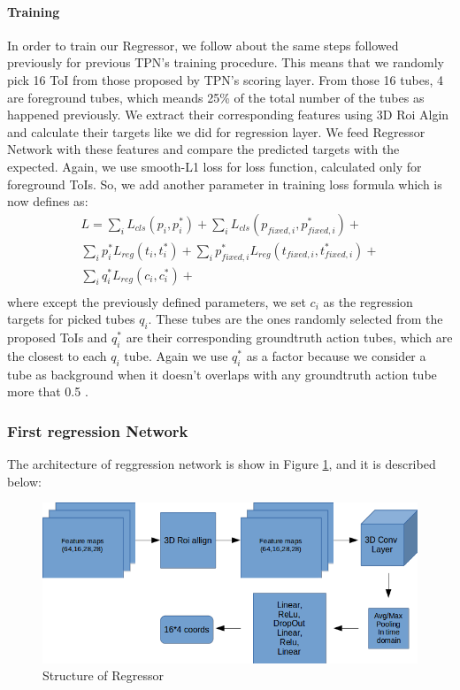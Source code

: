 \documentclass{report}
\begin{document}
\paragraph{ Training}
In order to train our Regressor, we follow about the same steps followed previously for previous TPN's training procedure. This means that
we randomly pick 16 ToI from those proposed by TPN's scoring layer. From those 16 tubes, 4 are foreground tubes, which meands 25\% of the total
number of the tubes as happened previously. We extract their corresponding features using 3D Roi Algin and calculate their targets like
we did for regression layer. We feed Regressor Network with these features and compare the predicted targets with the expected.
Again, we use smooth-L1 loss for loss function, calculated only for foreground ToIs. So, we add another parameter in
training loss formula which is now defines as:
\begin{equation} 
\begin{split}
 L  =  \sum_iL_{cls}(p_i, p_i^*) + \sum_iL_{cls}(p_{fixed,i}, p_{fixed,i}^*) + \\
 \sum_ip_i^*L_{reg}(t_i,t_i^*) + \sum_ip_{fixed,i}^*L_{reg}(t_{fixed,i},t_{fixed,i}^*) + \\
  \sum_iq_i^*L_{reg}(c_{i}, c_{i}^*) + \\
\end{split}
\end{equation}
where  except the previously defined parameters, we set  $c_{i} $ as the regression targets for picked tubes $q_i$.
These tubes are the ones randomly selected from the proposed ToIs and $q_i^*$ are their corresponding groundtruth action tubes, which are the closest to each $q_i$ tube.
Again we use $q_i^*$ as a factor because we consider a tube as background when it doesn't overlaps with any groundtruth action tube more that 0.5 .

\subsubsection{First regression Network} 

The architecture of reggression network is show in Figure \ref{fig:regressor_3d}, and it is described below:
\begin{figure}[h]
  \centering
  \includegraphics[scale=0.48]{regressor_1_1}
  \caption{Structure of Regressor}
  \label{fig:regressor_3d}
\end{figure}
\end{document}
